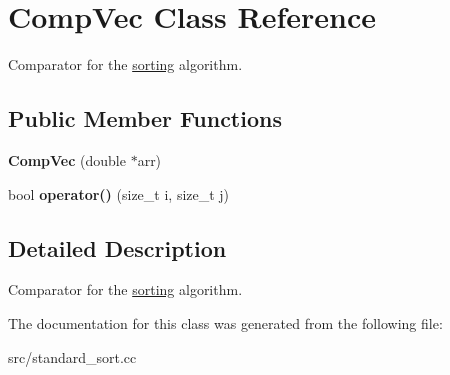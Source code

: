 \hypertarget{classCompVec}{
\section{CompVec Class Reference}
\label{d7/d1f/classCompVec}
}


Comparator for the \hyperlink{classsorting}{sorting} algorithm.  
\subsection*{Public Member Functions}
\begin{DoxyCompactItemize}
\item 
\hypertarget{classCompVec_a6963b86bb7b027c564f9fcbfa48631ff}{
{\bfseries CompVec} (double $\ast$arr)}
\label{d7/d1f/classCompVec_a6963b86bb7b027c564f9fcbfa48631ff}

\item 
\hypertarget{classCompVec_af72aba58e4ec029df30580c71c965490}{
bool {\bfseries operator()} (size\_\-t i, size\_\-t j)}
\label{d7/d1f/classCompVec_af72aba58e4ec029df30580c71c965490}

\end{DoxyCompactItemize}


\subsection{Detailed Description}
Comparator for the \hyperlink{classsorting}{sorting} algorithm. 

The documentation for this class was generated from the following file:\begin{DoxyCompactItemize}
\item 
src/standard\_\-sort.cc\end{DoxyCompactItemize}
